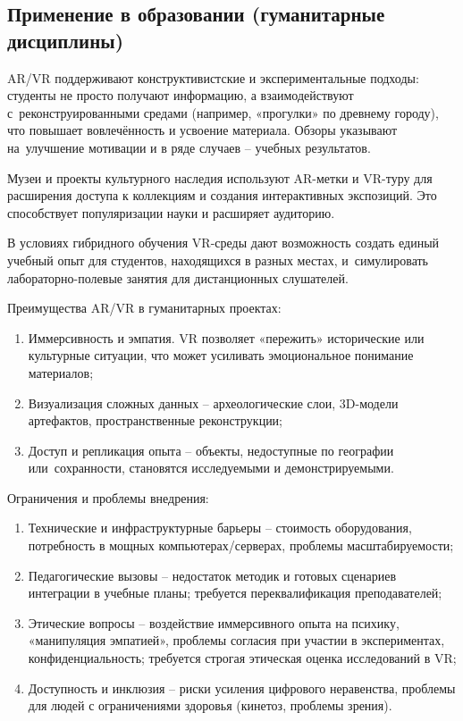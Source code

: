 \documentclass{ou}
\begin{document}
\subsection{Применение в образовании (гуманитарные дисциплины)}
AR/VR поддерживают конструктивистские и экспериментальные подходы: студенты не просто получают информацию, а взаимодействуют с~реконструированными средами (например, «прогулки» по древнему городу), что повышает вовлечённость и усвоение материала. Обзоры указывают на~улучшение мотивации и в ряде случаев -- учебных результатов. 

Музеи и проекты культурного наследия используют AR-метки и VR-туру для расширения доступа к коллекциям и создания интерактивных экспозиций. Это способствует популяризации науки и расширяет аудиторию. 

В условиях гибридного обучения VR-среды дают возможность создать единый учебный опыт для студентов, находящихся в разных местах, и~симулировать лабораторно-полевые занятия для дистанционных слушателей.

Преимущества AR/VR в гуманитарных проектах:
\begin{enumerate}[leftmargin=0em, itemindent=3.75em, nosep, label=\arabic*)]
\item Иммерсивность и эмпатия. VR позволяет «пережить» исторические или культурные ситуации, что может усиливать эмоциональное понимание материалов;
\item Визуализация сложных данных -- археологические слои, 3D-модели артефактов, пространственные реконструкции;
\item Доступ и репликация опыта -- объекты, недоступные по географии или~сохранности, становятся исследуемыми и демонстрируемыми. 
\end{enumerate}

Ограничения и проблемы внедрения:
\begin{enumerate}[leftmargin=0em, itemindent=3.75em, nosep, label=\arabic*)]
\item Технические и инфраструктурные барьеры -- стоимость оборудования, потребность в мощных компьютерах/серверах, проблемы масштабируемости;
\item Педагогические вызовы -- недостаток методик и готовых сценариев интеграции в учебные планы; требуется переквалификация преподавателей;
\item Этические вопросы -- воздействие иммерсивного опыта на психику, «манипуляция эмпатией», проблемы согласия при участии в экспериментах, конфиденциальность; требуется строгая этическая оценка исследований в VR;
\item Доступность и инклюзия -- риски усиления цифрового неравенства, проблемы для людей с ограничениями здоровья (кинетоз, проблемы зрения). 
\end{enumerate}
\end{document}
